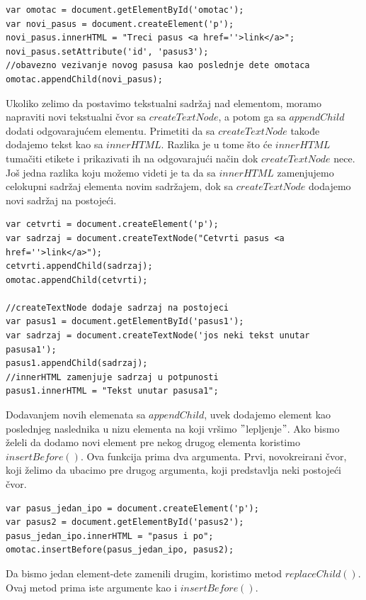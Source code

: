 \begin{lstlisting}[backgroundcolor = \color{lightgray}, breaklines=true]
var omotac = document.getElementById('omotac');
var novi_pasus = document.createElement('p');
novi_pasus.innerHTML = "Treci pasus <a href=''>link</a>";
novi_pasus.setAttribute('id', 'pasus3');
//obavezno vezivanje novog pasusa kao poslednje dete omotaca
omotac.appendChild(novi_pasus);
\end{lstlisting}

Ukoliko zelimo da postavimo tekstualni sadržaj nad elementom, moramo napraviti novi tekstualni čvor sa $createTextNode$, a potom ga sa $appendChild$ dodati odgovarajućem elementu. Primetiti da sa $createTextNode$ takođe dodajemo tekst kao sa $innerHTML$. Razlika je u tome što će $innerHTML$ tumačiti etikete i prikazivati ih na odgovarajući način dok $createTextNode$ nece. Još jedna razlika koju možemo videti je ta da sa $innerHTML$ zamenjujemo celokupni sadržaj elementa novim sadržajem, dok sa $createTextNode$ dodajemo novi sadržaj na postojeći.

\begin{lstlisting}[backgroundcolor = \color{lightgray}, breaklines=true]
var cetvrti = document.createElement('p');
var sadrzaj = document.createTextNode("Cetvrti pasus <a href=''>link</a>");
cetvrti.appendChild(sadrzaj);
omotac.appendChild(cetvrti);

//createTextNode dodaje sadrzaj na postojeci
var pasus1 = document.getElementById('pasus1');
var sadrzaj = document.createTextNode('jos neki tekst unutar pasusa1');
pasus1.appendChild(sadrzaj);
//innerHTML zamenjuje sadrzaj u potpunosti
pasus1.innerHTML = "Tekst unutar pasusa1";
\end{lstlisting}

Dodavanjem novih elemenata sa $appendChild$, uvek dodajemo element kao poslednjeg naslednika u nizu elementa na koji vršimo $"$lepljenje$"$. Ako bismo želeli da dodamo novi element pre nekog drugog elementa koristimo $insertBefore()$. Ova funkcija prima dva argumenta. Prvi, novokreirani čvor, koji želimo da ubacimo pre drugog argumenta, koji predstavlja neki postojeći čvor. 
\begin{lstlisting}[backgroundcolor = \color{lightgray}, breaklines=true]
var pasus_jedan_ipo = document.createElement('p');
var pasus2 = document.getElementById('pasus2');
pasus_jedan_ipo.innerHTML = "pasus i po";
omotac.insertBefore(pasus_jedan_ipo, pasus2);
\end{lstlisting}

Da bismo jedan element-dete zamenili drugim, koristimo metod $replaceChild()$. Ovaj metod prima iste argumente kao i $insertBefore()$.

